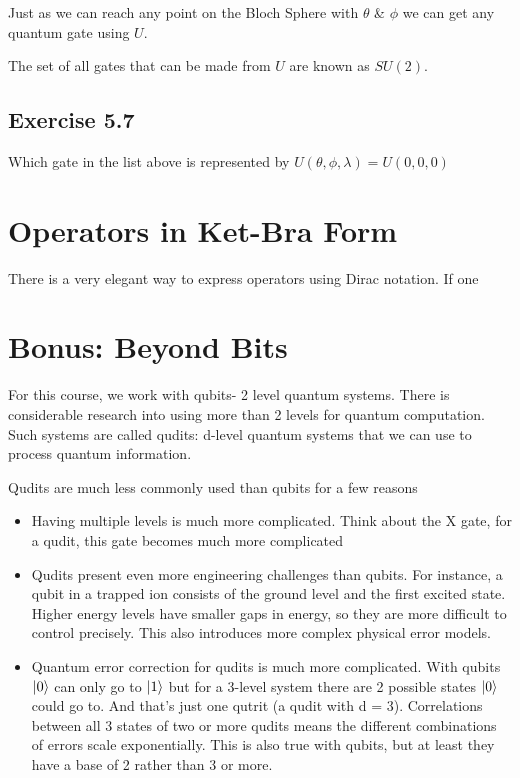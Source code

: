 \documentclass{book}
\begin{document}
Just as we can reach any point on the Bloch Sphere with $\theta$ \& $\phi$ we can get any quantum gate using $U$. 

The set of all gates that can be made from $U$ are known as $SU(2)$. \newline
\hline
\subsection{Exercise 5.7}
Which gate in the list above is represented by  $U(\theta, \phi, \lambda) = U(0,0,0)$ \newline 
\hline

\section{ Operators in Ket-Bra Form}

There is a very elegant way to express operators using Dirac notation. If one 

\section{ Bonus: Beyond Bits }

For this course, we work with qubits- 2 level quantum systems. There is considerable research into using more than 2 levels for quantum computation. Such systems are called qudits: d-level quantum systems that we can use to process quantum information. 

Qudits are much less commonly used than qubits for a few reasons
\begin{itemize}
\item Having multiple levels is much more complicated. Think about the X gate, for a qudit, this gate becomes much more complicated

\item Qudits present even more engineering challenges than qubits. For instance, a qubit in a trapped ion consists of the ground level and the first excited state. Higher energy levels have smaller gaps in energy, so they are more difficult to control precisely. This also introduces more complex physical error models. 

\item Quantum error correction for qudits is much more complicated. With qubits $\ket{0}$ can only go to $\ket{1}$ but for a 3-level system there are 2 possible states $\ket{0}$ could go to. And that's just one qutrit (a qudit with d = 3). Correlations between all 3 states of two or more qudits means the different combinations of errors scale exponentially. This is also true with qubits, but at least they have a base of 2 rather than 3 or more.
\end{itemize}
\end{document}
